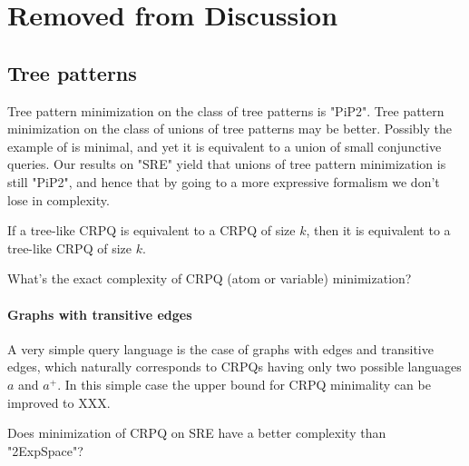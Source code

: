 


\section{Removed from Discussion}
\subsection{Tree patterns} Tree pattern minimization on the class of tree patterns is "PiP2". Tree pattern minimization on the class of unions of tree patterns may be better. Possibly the example of \cite[Fig.~9]{min-tree-patterns} is minimal, and yet it is equivalent to a union of small conjunctive queries.
Our results on "SRE" yield that unions of tree pattern minimization is still "PiP2", and hence that by going to a more expressive formalism we don't lose in complexity.

\begin{conjecture}
If a tree-like CRPQ is equivalent to a CRPQ of size $k$, then it is equivalent to a tree-like CRPQ of size $k$.
\end{conjecture}



\begin{openproblem}
    What's the exact complexity of CRPQ (atom or variable) minimization?
\end{openproblem}

\paragraph{Graphs with transitive edges} A very simple query language is the case of graphs with edges and transitive edges, which naturally corresponds to CRPQs having only two possible languages $a$ and $a^+$. In this simple case the upper bound for CRPQ minimality can be improved to XXX.

\begin{openproblem}
    Does minimization of CRPQ on SRE have a better complexity than "2ExpSpace"?
\end{openproblem}